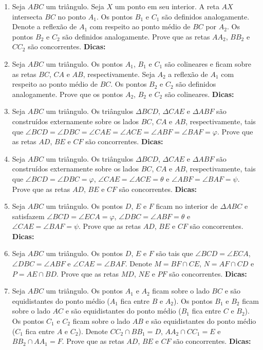 \documentclass{article}
\newcommand{\dica}{\textbf{Dicas:}}
\newcommand{\iniTri}{Seja $ABC$ um triângulo}
\begin{document}
\begin{multicols}{2}
\begin{enumerate}
    \item \iniTri. Seja $X$ um ponto em seu interior. A reta $AX$ intersecta $BC$ no ponto $A_1$. Os pontos $B_1$ e $C_1$ são definidos analogamente. Denote a reflexão de $A_1$ com respeito ao ponto médio de $BC$ por $A_2$. Os pontos $B_2$ e $C_2$ são definidos analogamente. Prove que as retas $AA_2$, $BB_2$ e $CC_2$ são concorrentes. \dica %
    
    \item \iniTri. Os pontos $A_1$, $B_1$ e $C_1$ são colineares e ficam sobre as retas $BC$, $CA$ e $AB$, respectivamente. Seja $A_2$ a reflexão de $A_1$ com respeito ao ponto médio de $BC$. Os pontos $B_2$ e $C_2$ são definidos analogamente. Prove que os pontos $A_2$, $B_2$ e $C_2$ são colineares. \dica %
    
    \item \iniTri. Os triângulos $\Delta BCD$, $\Delta CAE$ e $\Delta ABF$ são construídos externamente sobre os lados $BC$, $CA$ e $AB$, respectivamente, tais que $\angle BCD=\angle DBC=\angle CAE=\angle ACE=\angle ABF=\angle BAF=\varphi$. Prove que as retas $AD$, $BE$ e $CF$ são concorrentes. \dica %
    
    \item \iniTri. Os triângulos $\Delta BCD$, $\Delta CAE$ e $\Delta ABF$ são construídos externamente sobre os lados $BC$, $CA$ e $AB$, respectivamente, tais que $\angle BCD=\angle DBC=\varphi$, $\angle CAE=\angle ACE=\theta$ e $\angle ABF=\angle BAF=\psi$. Prove que as retas $AD$, $BE$ e $CF$ são concorrentes. \dica %
    
    \item \iniTri. Os pontos $D$, $E$ e $F$ ficam no interior de $\Delta ABC$ e satisfazem $\angle BCD=\angle ECA=\varphi$, $\angle DBC=\angle ABF=\theta$ e $\angle CAE=\angle BAF=\psi$. Prove que as retas $AD$, $BE$ e $CF$ são concorrentes. \dica %
    
    \item \iniTri. Os pontos $D$, $E$ e $F$ são tais que $\angle BCD=\angle ECA$, $\angle DBC=\angle ABF$ e $\angle CAE=\angle BAF$. Denote $M=BF\cap CE$, $N=AF\cap CD$ e $P=AE\cap BD$. Prove que as retas $MD$, $NE$ e $PF$ são concorrentes. \dica %
    
    \item \iniTri. Os pontos $A_1$ e $A_2$ ficam sobre o lado $BC$ e são equidistantes do ponto médio ($A_1$ fica entre $B$ e $A_2$). Os pontos $B_1$ e $B_2$ ficam sobre o lado $AC$ e são equidistantes do ponto médio ($B_1$ fica entre $C$ e $B_2$). Os pontos $C_1$ e $C_2$ ficam sobre o lado $AB$ e são equidistantes do ponto médio ($C_1$ fica entre $A$ e $C_2$). Denote $CC_2\cap BB_1=D$, $AA_2\cap CC_1=E$ e $BB_2\cap AA_1=F$. Prove que as retas $AD$, $BE$ e $CF$ são concorrentes. \dica %
    

\end{enumerate}
\end{multicols}
\end{document}
